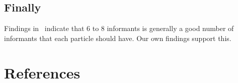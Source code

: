 \documentclass[11pt]{article}
\begin{document}
\subsection{Finally}
Findings in~\autocite{garcia-nietoWhySixInformants2012,garcia-nietoEmpiricalComputationQuasioptimal2011} indicate that 6 to 8 informants is generally a good number of informants that each particle should have. 
Our own findings support this.

\pagebreak
\appendix

\section{References}
\printbibliography
\end{document}

